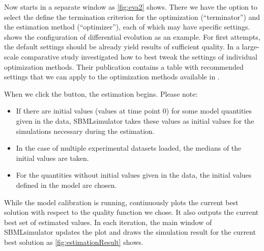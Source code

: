 Now \EvA starts in a separate window as \cref{fig:eva2} shows.
There we have the option to select the define the termination criterion for the optimization (``terminator'') and the estimation method (``optimizer''), each of which may have specific settings.
 shows the configuration of differential evolution \citep{Storn96Usage} as an example.
For first attempts, the default settings should be already yield results of sufficient quality.
In a large-scale comparative study \citet{Draeger2009a} investigated how to best tweak the settings of individual optimization methods.
Their publication contains a table with recommended settings that we can apply to the optimization methods available in \EvA.

When we click the  button, the estimation begins.
Please note:
\begin{itemize}
  \item If there are initial values (\ie values at time point 0) for some model quantities given in the data, SBMLsimulator takes these values as initial values for the simulations necessary during the estimation.
  \item In the case of multiple experimental datasets loaded, the medians of the initial values are taken.
  \item For the quantities without initial values given in the data, the initial values defined in the model are chosen.
\end{itemize}

While the model calibration is running, \EvA continuously plots the current best solution with respect to the quality function we chose.
It also outputs the current best set of estimated values.
In each iteration, the main window of SBMLsimulator updates the plot and draws the simulation result for the current best solution as \cref{fig:estimationResult} shows.


\begin{SCfigure}
{}
\caption[\EvA settings window]{\EvA settings window.
\EvA lets us choose the parameter estimation method and the specific settings:
We just click at the text field next to the label ``optimizer.''
A separate dialog window will appear that offers a large number of optimization procedures (\cref{fig:algorithmChoice} shows this dialog for the example of differential evolution).
In the same way, an appropriate termination criterion can also be set by clicking at the text field that is labeled ``terminator.''
After clicking the  button, the estimation begins.
During the optimization, a window will appear that displays the quality improvement of the solution, the so-called \emph{\fitness}.
This is the distance between our experimental data and the simulation result for the currently best parameter set that we defined in \cref{sec:QualityDefinition}.
If the optimization is successful, the fitness will decrease as time proceeds.
We can interrupt the optimization at any time by hitting the  button.
When our selected termination criterion is reached, the optimization will stop and we can continue working with our optimized model in the main window of SBMLsimulator.}
\label{fig:eva2}
\end{SCfigure}


